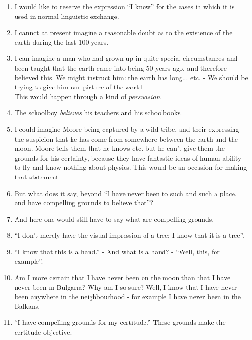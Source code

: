 \documentclass{book}
\begin{document}
\begin{enumerate}
\item
I would like to reserve the expression ``I know'' for the cases in which it is
used in normal linguistic exchange.

\item
I cannot at present imagine a reasonable doubt as to the existence of the earth
during the last 100 years.

\item
I can imagine a man who had grown up in quite special circumstances and been
taught that the earth came into being 50 years ago, and therefore believed
this. We might instruct him: the earth has long... etc. - We should be trying
to give him our picture of the world. \\
This would happen through a kind of \emph{persuasion}.

\item
The schoolboy \emph{believes} his teachers and his schoolbooks.

\item
I could imagine Moore being captured by a wild tribe, and their expressing the
suspicion that he has come from somewhere between the earth and the moon. Moore
tells them that he knows etc. but he can't give them the grounds for his
certainty, because they have fantastic ideas of human ability to fly and know
nothing about physics. This would be an occasion for making that statement.

\item
But what does it say, beyond ``I have never been to such and such a place, and
have compelling grounds to believe that''?

\item
And here one would still have to say what are compelling grounds.

\item
``I don't merely have the visual impression of a tree: I know that it is a
tree''.

\item
``I know that this is a hand.'' - And what is a hand? - ``Well, this, for
example''.

\item
Am I more certain that I have never been on the moon than that I have never
been in Bulgaria? Why am I so sure? Well, I know that I have never been
anywhere in the neighbourhood - for example I have never been in the Balkans.

\item
``I have compelling grounds for my certitude.'' These grounds make the
certitude objective.


\end{enumerate}
\end{document}
